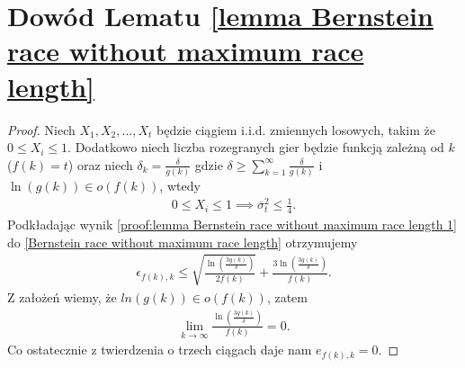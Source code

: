 \documentclass[inzynierska]{pwr_wmat_praca_dyplomowa}
\theoremstyle{plain}
\numberwithin{theorem}{chapter}
\theoremstyle{definition}
\numberwithin{theorem}{chapter}
\begin{document}
\section{Dowód Lematu \ref{lemma Bernstein race without maximum race length}}\label{proof:lemma Bernstein race without maximum race length}
\begin{proof}
	Niech $X_1, X_2, \dots, X_t$ będzie ciągiem i.i.d. zmiennych losowych, takim że  $0 \le X_i \le 1$. Dodatkowo niech liczba rozegranych gier będzie funkcją zależną od $k$ ($f(k) = t$) oraz niech $\delta_k = \frac{\delta}{g(k)}$
	gdzie $\delta \ge \sum_{k=1}^{\infty} \frac{\delta}{g(k)}$ i $\ln(g(k)) \in o(f(k))$, wtedy
	\begin{gather}
		\label{proof:lemma Bernstein race without maximum race length 1}
		0\le X_i \le 1 \implies \overline{\sigma}_t^2 \le \frac{1}{4}.
	\end{gather}
	Podkładając wynik \eqref{proof:lemma Bernstein race without maximum race length 1} do \eqref{Bernstein race without maximum race length} otrzymujemy 
	\begin{gather*}
		\epsilon_{f(k), k} \le  \sqrt{\frac{\ln(\frac{3g(k)}{\delta})}{2f(k)}} + \frac{3  \ln{(\frac{3g(k)}{\delta})}}{f(k)}.
	\end{gather*}
	Z założeń wiemy, że $ln(g(k)) \in o(f(k))$, zatem
	\begin{gather*}
		\lim\limits_{k\to\infty} \frac{  \ln{(\frac{3g(k)}{\delta})}}{f(k)} = 0.
	\end{gather*}
	Co ostatecznie z twierdzenia o trzech ciągach daje nam $e_{f(k), k} = 0$.
\end{proof}
\end{document}
